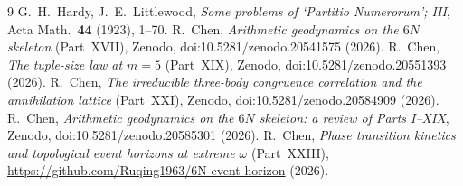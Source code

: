 \documentclass[11pt,a4paper]{article}
\begin{document}
\begin{thebibliography}{9}
 G.~H.~Hardy, J.~E.~Littlewood, \emph{Some problems of `Partitio
Numerorum'; III}, Acta Math.\ \textbf{44} (1923), 1--70.
 R.~Chen, \emph{Arithmetic geodynamics on the $6N$ skeleton}
(Part~XVII), Zenodo, doi:10.5281/zenodo.20541575 (2026).
 R.~Chen, \emph{The tuple-size law at $m=5$} (Part~XIX), Zenodo,
doi:10.5281/zenodo.20551393 (2026).
 R.~Chen, \emph{The irreducible three-body congruence correlation
and the annihilation lattice} (Part~XXI), Zenodo, doi:10.5281/zenodo.20584909 (2026).
 R.~Chen, \emph{Arithmetic geodynamics on the $6N$ skeleton: a
review of Parts I--XIX}, Zenodo, doi:10.5281/zenodo.20585301 (2026).
 R.~Chen, \emph{Phase transition kinetics and topological event
horizons at extreme $\omega$} (Part~XXIII),
\url{https://github.com/Ruqing1963/6N-event-horizon} (2026).
\end{thebibliography}
\end{document}
